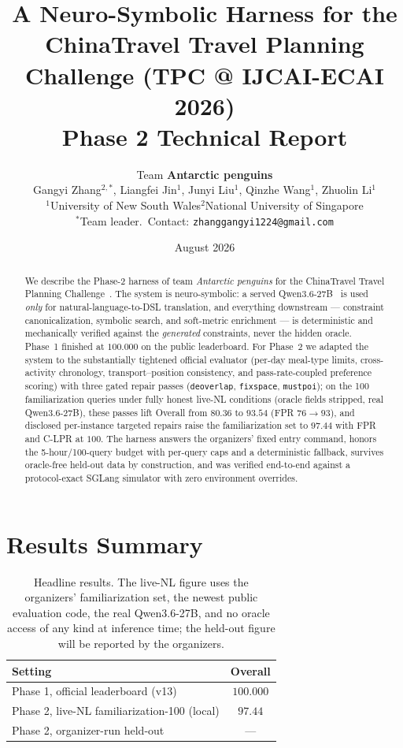 \documentclass{article}
\title{\bf A Neuro-Symbolic Harness for the ChinaTravel Travel Planning
Challenge (TPC @ IJCAI-ECAI 2026)\\[1mm]\large Phase 2 Technical Report}
\author{Team \textbf{Antarctic penguins}\\[0.5mm]
\small Gangyi Zhang$^{2,*}$, Liangfei Jin$^{1}$, Junyi Liu$^{1}$,
Qinzhe Wang$^{1}$, Zhuolin Li$^{1}$\\
\small $^{1}$University of New South Wales\quad $^{2}$National University of Singapore\\
\small $^{*}$Team leader.\ Contact: \texttt{zhanggangyi1224@gmail.com}}
\date{August 2026}
\begin{document}
\twocolumn[\maketitle]

\begin{abstract}
We describe the Phase-2 harness of team \emph{Antarctic penguins} for the
ChinaTravel Travel Planning Challenge~\cite{chinatravel,tpc}. The system is
neuro-symbolic: a served Qwen3.6-27B~\cite{qwen} is used \emph{only} for
natural-language-to-DSL translation, and everything downstream ---
constraint canonicalization, symbolic search, and soft-metric enrichment ---
is deterministic and mechanically verified against the \emph{generated}
constraints, never the hidden oracle. Phase~1 finished at $100.000$ on the
public leaderboard. For Phase~2 we adapted the system to the substantially
tightened official evaluator (per-day meal-type limits, cross-activity
chronology, transport--position consistency, and pass-rate-coupled
preference scoring) with three gated repair passes (\texttt{deoverlap},
\texttt{fixspace}, \texttt{mustpoi}); on the 100 familiarization queries
under fully honest live-NL conditions (oracle fields stripped, real
Qwen3.6-27B), these passes lift Overall from $80.36$ to $93.54$ (FPR $76\!\to\!93$),
and disclosed per-instance targeted repairs raise the familiarization set
to $\mathbf{97.44}$ with FPR and C-LPR at $100$. The harness answers the
organizers' fixed entry command, honors the 5-hour/100-query budget with
per-query caps and a deterministic fallback, survives oracle-free held-out
data by construction, and was verified end-to-end against a protocol-exact
SGLang simulator with zero environment overrides.
\end{abstract}

\section{Results Summary}

\begin{table}[t]
\centering
\footnotesize
\begin{tabular}{@{}lc@{}}
\toprule
Setting & Overall\\
\midrule
Phase 1, official leaderboard (v13) & $\mathbf{100.000}$\\
Phase 2, live-NL familiarization-100 (local) & $\mathbf{97.44}$\\
Phase 2, organizer-run held-out & ---\\
\bottomrule
\end{tabular}
\caption{Headline results. The live-NL figure uses the organizers'
familiarization set, the newest public evaluation code, the real
Qwen3.6-27B, and no oracle access of any kind at inference time; the
held-out figure will be reported by the organizers.}
\end{table}
\end{document}
